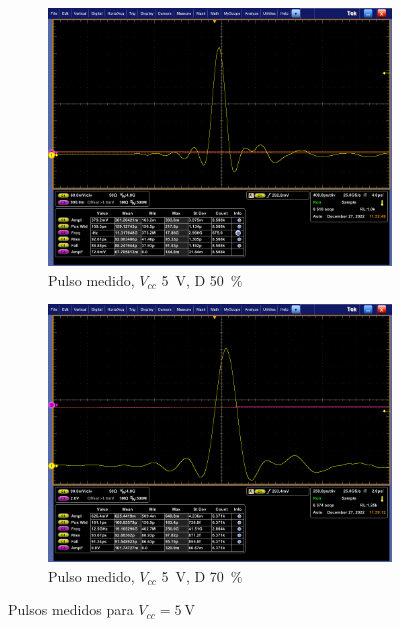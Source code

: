 \begin{figure}[t!]
    \centering
    \begin{subfigure}[b]{0.49\textwidth}
        \centering
        \includegraphics[width=\textwidth]{images/mediciones/vcc_5v_duty_50.png}
        \caption{Pulso medido, $V_{cc}$ \qty{5}{\volt}, D \qty{50}{\percent} }
        \label{fig:mediciones_5v_50}
    \end{subfigure}
    \hfill
    \begin{subfigure}[b]{0.49\textwidth}
        \centering
        \includegraphics[width=\textwidth]{images/mediciones/vcc_5v_duty_70.png}
        \caption{Pulso medido, $V_{cc}$ \qty{5}{\volt}, D \qty{70}{\percent} }
        \label{fig:mediciones_5v_70}
    \end{subfigure}
    \caption{Pulsos medidos para $V_{cc} = \qty{5}{\volt}$}
    \label{fig:mediciones_5v}
\end{figure}

